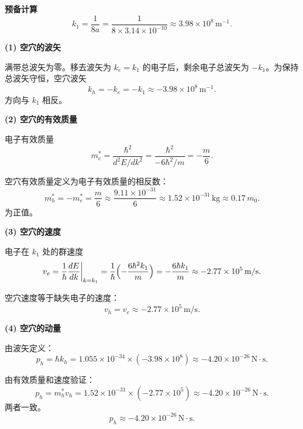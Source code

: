\begin{derivationbox}[标准解题过程]
\textbf{预备计算}
\begin{equation}
k_1=\frac{1}{8a}=\frac{1}{8\times3.14\times10^{-10}}\approx3.98\times10^8\,\text{m}^{-1}.
\end{equation}

\textbf{(1) 空穴的波矢}

满带总波矢为零。移去波矢为 $k_e=k_1$ 的电子后，剩余电子总波矢为 $-k_1$。为保持总波矢守恒，空穴波矢
\begin{equation}
\boxed{k_h=-k_e=-k_1\approx-3.98\times10^8\,\text{m}^{-1}.}
\end{equation}
方向与 $k_1$ 相反。

\textbf{(2) 空穴的有效质量}

电子有效质量
\begin{equation}
m_e^*=\frac{\hbar^2}{d^2E/dk^2}=\frac{\hbar^2}{-6\hbar^2/m}=-\frac{m}{6}.
\end{equation}

空穴有效质量定义为电子有效质量的相反数：
\begin{equation}
\boxed{m_h^*=-m_e^*=\frac{m}{6}\approx\frac{9.11\times10^{-31}}{6}\approx1.52\times10^{-31}\,\text{kg}\approx0.17\,m_0.}
\end{equation}
为正值。

\textbf{(3) 空穴的速度}

电子在 $k_1$ 处的群速度
\begin{equation}
v_e=\frac{1}{\hbar}\frac{dE}{dk}\bigg|_{k=k_1}=\frac{1}{\hbar}\Bigl(-\frac{6\hbar^2k_1}{m}\Bigr)=-\frac{6\hbar k_1}{m}
\approx-2.77\times10^5\,\text{m/s}.
\end{equation}

空穴速度等于缺失电子的速度：
\begin{equation}
\boxed{v_h=v_e\approx-2.77\times10^5\,\text{m/s}.}
\end{equation}

\textbf{(4) 空穴的动量}

由波矢定义：
\begin{equation}
p_h=\hbar k_h=1.055\times10^{-34}\times(-3.98\times10^8)\approx-4.20\times10^{-26}\,\text{N}\cdot\text{s}.
\end{equation}

由有效质量和速度验证：
\begin{equation}
p_h=m_h^*v_h=1.52\times10^{-31}\times(-2.77\times10^5)\approx-4.20\times10^{-26}\,\text{N}\cdot\text{s}.
\end{equation}
两者一致。
\begin{equation}
\boxed{p_h\approx-4.20\times10^{-26}\,\text{N}\cdot\text{s}.}
\end{equation}


\end{derivationbox}
